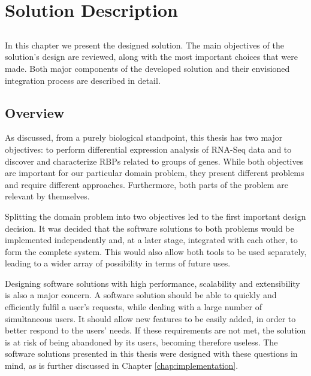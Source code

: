 \chapter{Solution Description} \label{chap:description}

\section*{}

In this chapter we present the designed solution. The main objectives of the
solution's design are reviewed, along with the most important choices that were
made. Both major components of the developed solution and their envisioned
integration process are described in detail.

\section{Overview}


As discussed, from a purely biological standpoint, this thesis has two major
objectives: to perform differential expression analysis of RNA-Seq data and to
discover and characterize RBPs related to groups of genes. While both objectives
are important for our particular domain problem, they present different problems
and require different approaches. Furthermore, both parts of the problem are
relevant by themselves.

Splitting the domain problem into two objectives led to the first important
design decision. It was decided that the software solutions to both problems
would be implemented independently and, at a later stage, integrated with each
other, to form the complete system. This would also allow both tools to be used
separately, leading to a wider array of possibility in terms of future uses.

Designing software solutions with high performance, scalability and
extensibility is also a major concern. A software solution should be able to
quickly and efficiently fulfil a user's requests, while dealing with a large
number of simultaneous users. It should allow new features to be easily added,
in order to better respond to the users' needs. If these requirements are not
met, the solution is at risk of being abandoned by its users, becoming therefore
useless. The software solutions presented in this thesis were designed with
these questions in mind, as is further discussed in Chapter
\ref{chap:implementation}.

